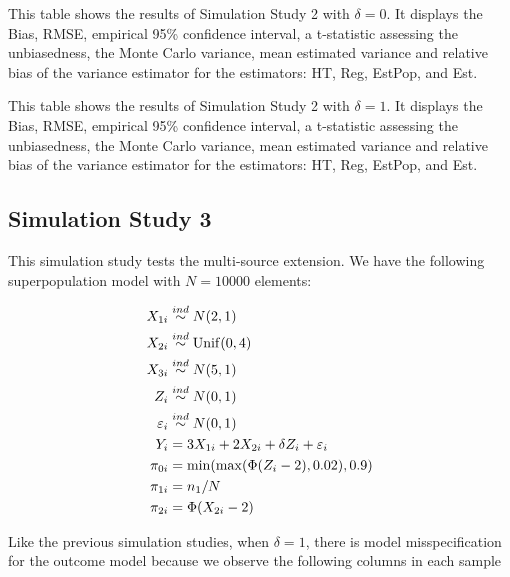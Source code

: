 \documentclass[12pt]{article}
\begin{document}
\begin{table}[ht!]
  \centering
  
\caption{This table shows the results of Simulation Study 2 with $\delta = 0$.
  It displays the Bias, RMSE, empirical 95\% confidence interval, a t-statistic
  assessing the unbiasedness, the Monte Carlo variance, mean estimated variance
  and relative bias of the variance estimator for the estimators: HT, Reg,
  EstPop, and Est.}
\label{tab:nndc0-mean}
\end{table}

\begin{table}[ht!]
  \centering
  
\caption{This table shows the results of Simulation Study 2 with $\delta = 1$.
  It displays the Bias, RMSE, empirical 95\% confidence interval, a t-statistic
  assessing the unbiasedness, the Monte Carlo variance, mean estimated variance
  and relative bias of the variance estimator for the estimators: HT, Reg,
  EstPop, and Est.}
\label{tab:nndc1-mean}
\end{table}

\subsection{Simulation Study 3}

This simulation study tests the multi-source extension.
We have the following superpopulation model with $N = 10000$ elements:

$$
\begin{aligned}
X_{1i} &\stackrel{ind}{\sim} N(2, 1) \\
X_{2i} &\stackrel{ind}{\sim} \rm{Unif}(0, 4) \\
X_{3i} &\stackrel{ind}{\sim} N(5, 1) \\
Z_i &\stackrel{ind}{\sim} N(0, 1) \\
\varepsilon_i &\stackrel{ind}{\sim} N(0, 1) \\
Y_{i} &= 3 X_{1i} + 2 X_{2i} + \delta Z_{i} + \varepsilon_i \\
\pi_{0i} &= \min(\max(\Phi(Z_i - 2), 0.02), 0.9)\\
\pi_{1i} &= n_1 / N\\
\pi_{2i} &= \Phi(X_{2i} - 2) \\
\end{aligned}
$$

Like the previous simulation studies, when $\delta = 1$, there is model
misspecification for the outcome model because we observe the following columns
in each sample
\end{document}
